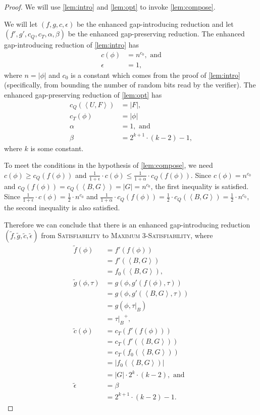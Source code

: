 \documentclass[]{article}
\newcommand{\pair}[2]{{\left\langle{#1}, {#2}\right\rangle}}
\begin{document}
\begin{proof}
  We will use \autoref{lem:intro} and \autoref{lem:opt} to invoke \autoref{lem:compose}.

  We will let $(f, g, c, \epsilon)$ be the \NC{} enhanced gap-introducing reduction and let $(f', g', c_Q, c_T, \alpha, \beta)$ be the \NC{} enhanced gap-preserving reduction.
  The enhanced gap-introducing reduction of \autoref{lem:intro} has
  \begin{align*}
    c(\phi) & = n^{c_0}, \text{ and} \\
    \epsilon & = 1,
  \end{align*}
  where $n = |\phi|$ and $c_0$ is a constant which comes from the proof of \autoref{lem:intro} (specifically, from bounding the number of random bits read by the verifier).
  The enhanced gap-preserving reduction of \autoref{lem:opt} has
  \begin{align*}
    c_Q(\pair{U}{F}) & = |F|, \\
    c_T(\phi) & = |\phi| \\
    \alpha & = 1, \text{ and} \\
    \beta & = 2^{k + 1} \cdot (k - 2) - 1,
  \end{align*}
  where $k$ is some constant.

  To meet the conditions in the hypothesis of \autoref{lem:compose}, we need $c(\phi) \geq c_Q(f(\phi))$ and $\frac{1}{1 + \epsilon} \cdot c(\phi) \leq \frac{1}{1 + \alpha} \cdot c_Q(f(\phi))$.
  Since $c(\phi) = n^{c_0}$ and $c_Q(f(\phi)) = c_Q(\pair{B}{G}) = |G| = n^{c_0}$, the first inequality is satisfied.
  Since $\frac{1}{1 + \epsilon} \cdot c(\phi) = \frac{1}{2} \cdot n^{c_0}$ and $\frac{1}{1 + \alpha} \cdot c_Q(f(\phi)) = \frac{1}{2} \cdot c_Q(\pair{B}{G}) = \frac{1}{2} \cdot n^{c_0}$, the second inequality is also satisfied.

  Therefore we can conclude that there is an \NC{} enhanced gap-introducing reduction $(\tilde{f}, \tilde{g}, \tilde{c}, \tilde{\epsilon})$ from \textsc{Satisfiability} to \textsc{Maximum 3-Satisfiability}, where
  \begin{align*}
    \tilde{f}(\phi) & = f'(f(\phi)) \\
    & = f'(\pair{B}{G}) \\
    & = f_0(\pair{B}{G}), \\
    \tilde{g}(\phi, \tau) & = g(\phi, g'(f(\phi), \tau)) \\
    & = g(\phi, g'(\pair{B}{G}, \tau)) \\
    & = g(\phi, \tau|_B) \\
    & = {\tau|_B}^+, \\
    \tilde{c}(\phi) & = c_T(f'(f(\phi))) \\
    & = c_T(f'(\pair{B}{G})) \\
    & = c_T(f_0(\pair{B}{G})) \\
    & = |f_0(\pair{B}{G})| \\
    & = |G| \cdot 2^k \cdot (k - 2), \text{ and} \\
    \tilde{\epsilon} & = \beta \\
    & = 2^{k + 1} \cdot (k - 2) - 1.
  \end{align*}
\end{proof}
\end{document}
